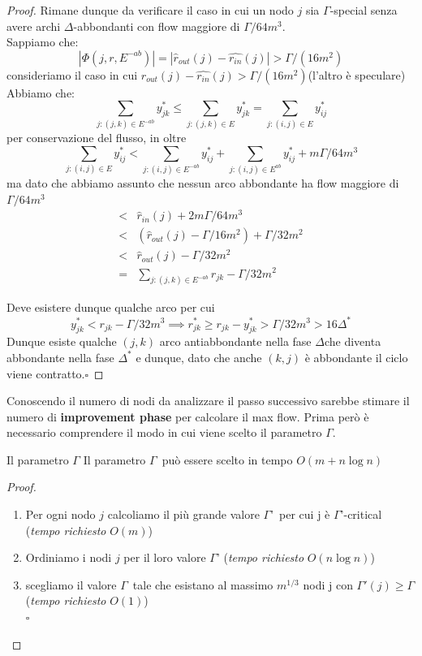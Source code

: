 \documentclass[a4paper, 11pt]{report}
\newcommand*{\QED}{\null\nobreak\hfill\ensuremath{\square}}%
\newcommand{\dlt}{$\Delta$}
\newcommand{\gmm}{$\Gamma$}
\begin{document}
\begin{proof}
    Rimane dunque da verificare il caso in cui un nodo $j$ sia \gmm-special senza avere archi $\Delta$-abbondanti con flow maggiore di $\Gamma/64m^3$.\\
    Sappiamo che:
    \[|\Phi (j, r, E^{-ab})| = |\hat{r}_{out}(j)-\hat{r_{in}}(j)|> \Gamma/(16m^2) \]
    consideriamo il caso in cui $\hat{r}_{out}(j)-\hat{r_{in}}(j)> \Gamma/(16m^2)$(l'altro è speculare)
    Abbiamo che:
    \[\sum_{j:(j,k)\in E^{-ab}}y^*_{jk} \le \sum_{j:(j,k)\in E}y^*_{jk} = \sum_{j:(i,j)\in E}y^*_{ij}\]
    per conservazione del flusso, in oltre 
    \[\sum_{j:(i,j)\in E}y^*_{ij} < \sum_{j:(i,j)\in E^{-ab}}y^*_{ij} + \sum_{j:(i,j)\in E^{ab}}y^*_{ij}+ m\Gamma/64m^3\]
    ma dato che abbiamo assunto che nessun arco abbondante ha flow maggiore di $\Gamma/64m^3$
    \[\begin{array}{rl}
        < & \hat{r}_{in}(j) + 2m\Gamma/64m^3\\
        < & (\hat{r}_{out}(j) - \Gamma/16m^2) + \Gamma/32m^2\\
        < & \hat{r}_{out}(j) - \Gamma/32m^2\\
        = & \sum_{j:(j,k)\in E^{-ab}}r_{jk} - \Gamma/32m^2
    \end{array}\]

    Deve esistere dunque qualche arco per cui 
    \[y^*_{jk}<r_{jk}-\Gamma/32m^3\implies r^*_{jk}\ge r_{jk}-y^*_{jk}>\Gamma/32m^3>16\Delta^*\]
    Dunque esiste qualche $(j,k)$ arco antiabbondante nella fase \dlt che diventa abbondante nella 
    fase $\Delta^*$ e dunque, dato che anche $(k,j)$ è abbondante il ciclo viene contratto.\QED
\end{proof}

Conoscendo il numero di nodi da analizzare il passo successivo sarebbe stimare il numero di \textbf{improvement phase} per calcolare il max flow. 
Prima però è necessario comprendere il modo in cui viene scelto il parametro \gmm.

\begin{lemma}[label = gammchose]{Il parametro \gmm}{}
    Il parametro \gmm\ può essere scelto in tempo $O(m+n\log n)$
\end{lemma}
\begin{proof}
    \begin{enumerate}
        \item Per ogni nodo $j$ calcoliamo il più grande valore \gmm'\ per cui j è \gmm'-critical (\textit{tempo richiesto} $O(m)$)
        \item Ordiniamo i nodi $j$ per il loro valore \gmm' (\textit{tempo richiesto }$O(n\log n)$)
        \item scegliamo il valore \gmm\ tale che esistano al massimo $m^{1/3}$ nodi j con $\Gamma'(j)\ge \Gamma$ (\textit{tempo richiesto }$O(1)$)\\\QED
    \end{enumerate}

\end{proof}
\end{document}
